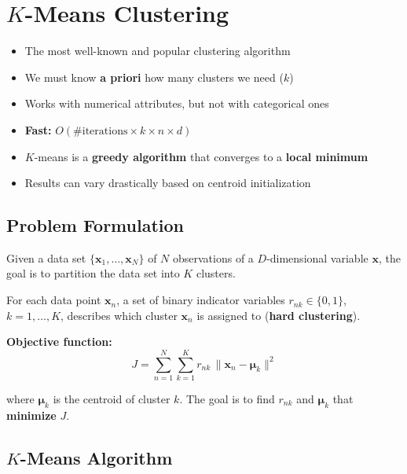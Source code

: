 \documentclass[11pt,a4paper]{article}
\theoremstyle{definition}
\theoremstyle{plain}
\theoremstyle{remark}
\begin{document}

\section{$K$-Means Clustering}

\begin{itemize}
    \item The most well-known and popular clustering algorithm
    \item We must know \textbf{a priori} how many clusters we need ($k$)
    \item Works with numerical attributes, but not with categorical ones
    \item \textbf{Fast:} $O(\text{\#iterations} \times k \times n \times d)$
    \item $K$-means is a \textbf{greedy algorithm} that converges to a \textbf{local minimum}
    \item Results can vary drastically based on centroid initialization
\end{itemize}

\subsection{Problem Formulation}

Given a data set $\{\mathbf{x}_1, \ldots, \mathbf{x}_N\}$ of $N$ observations of a $D$-dimensional variable $\mathbf{x}$, the goal is to partition the data set into $K$ clusters.

For each data point $\mathbf{x}_n$, a set of binary indicator variables $r_{nk} \in \{0, 1\}$, $k = 1, \ldots, K$, describes which cluster $\mathbf{x}_n$ is assigned to (\textbf{hard clustering}).

\textbf{Objective function:}
\[
J = \sum_{n=1}^{N} \sum_{k=1}^{K} r_{nk} \, \|\mathbf{x}_n - \boldsymbol{\mu}_k\|^2
\]

where $\boldsymbol{\mu}_k$ is the centroid of cluster $k$. The goal is to find $r_{nk}$ and $\boldsymbol{\mu}_k$ that \textbf{minimize} $J$.

\subsection{$K$-Means Algorithm}
\end{document}

